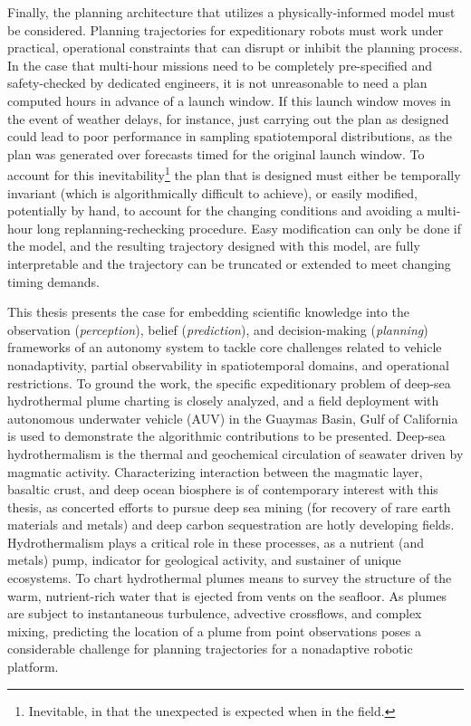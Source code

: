 Finally, the planning architecture that utilizes a physically-informed model must be considered.
Planning trajectories for expeditionary robots must work under practical, operational constraints that can disrupt or inhibit the planning process.
In the case that multi-hour missions need to be completely pre-specified and safety-checked by dedicated engineers, it is not unreasonable to need a plan computed hours in advance of a launch window. 
If this launch window moves in the event of weather delays, for instance, just carrying out the plan as designed could lead to poor performance in sampling spatiotemporal distributions, as the plan was generated over forecasts timed for the original launch window.
To account for this inevitability\footnote{Inevitable, in that the unexpected is expected when in the field.} the plan that is designed must either be temporally invariant (which is algorithmically difficult to achieve), or easily modified, potentially by hand, to account for the changing conditions and avoiding a multi-hour long replanning-rechecking procedure.
Easy modification can only be done if the model, and the resulting trajectory designed with this model, are fully interpretable and the trajectory can be truncated or extended to meet changing timing demands.

This thesis presents the case for embedding scientific knowledge into the observation (\emph{perception}), belief (\emph{prediction}), and decision-making (\emph{planning}) frameworks of an autonomy system to tackle core challenges related to vehicle nonadaptivity, partial observability in spatiotemporal domains, and operational restrictions. 
To ground the work, the specific expeditionary problem of deep-sea hydrothermal plume charting is closely analyzed, and a field deployment with autonomous underwater vehicle (AUV) \Sentry in the Guaymas Basin, Gulf of California is used to demonstrate the algorithmic contributions to be presented.
Deep-sea hydrothermalism is the thermal and geochemical circulation of seawater driven by magmatic activity.
Characterizing interaction between the magmatic layer, basaltic crust, and deep ocean biosphere is of contemporary interest with this thesis, as concerted efforts to pursue deep sea mining (for recovery of rare earth materials and metals) and deep carbon sequestration are hotly developing fields.
Hydrothermalism plays a critical role in these processes, as a nutrient (and metals) pump, indicator for geological activity, and sustainer of unique ecosystems.
To chart hydrothermal plumes means to survey the structure of the warm, nutrient-rich water that is ejected from vents on the seafloor.
As plumes are subject to instantaneous turbulence, advective crossflows, and complex mixing, predicting the location of a plume from point observations poses a considerable challenge for planning trajectories for a nonadaptive robotic platform.
 
